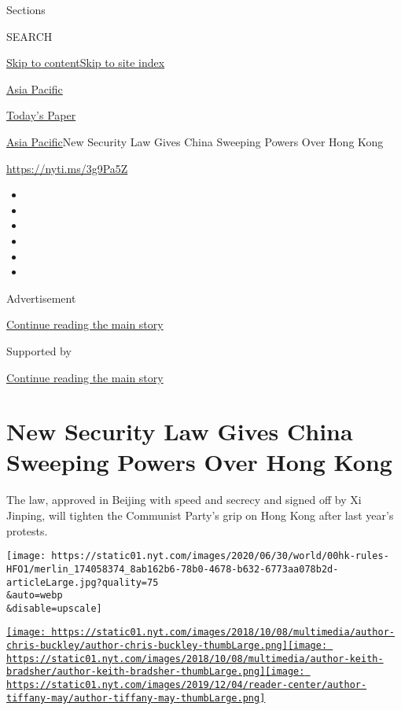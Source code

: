 Sections

SEARCH

\protect\hyperlink{site-content}{Skip to
content}\protect\hyperlink{site-index}{Skip to site index}

\href{https://www.nytimes.com/section/world/asia}{Asia Pacific}

\href{https://myaccount.nytimes.com/auth/login?response_type=cookie\&client_id=vi}{}

\href{https://www.nytimes.com/section/todayspaper}{Today's Paper}

\href{/section/world/asia}{Asia Pacific}\textbar{}New Security Law Gives
China Sweeping Powers Over Hong Kong

\url{https://nyti.ms/3g9Pa5Z}

\begin{itemize}
\item
\item
\item
\item
\item
\item
\end{itemize}

Advertisement

\protect\hyperlink{after-top}{Continue reading the main story}

Supported by

\protect\hyperlink{after-sponsor}{Continue reading the main story}

\hypertarget{new-security-law-gives-china-sweeping-powers-over-hong-kong}{%
\section{New Security Law Gives China Sweeping Powers Over Hong
Kong}\label{new-security-law-gives-china-sweeping-powers-over-hong-kong}}

The law, approved in Beijing with speed and secrecy and signed off by Xi
Jinping, will tighten the Communist Party's grip on Hong Kong after last
year's protests.

\texttt{[image: https://static01.nyt.com/images/2020/06/30/world/00hk-rules-HFO1/merlin\_174058374\_8ab162b6-78b0-4678-b632-6773aa078b2d-articleLarge.jpg?quality=75\\\&auto=webp\\\&disable=upscale]}

\href{https://www.nytimes.com/by/chris-buckley}{\texttt{[image: https://static01.nyt.com/images/2018/10/08/multimedia/author-chris-buckley/author-chris-buckley-thumbLarge.png]}}\href{https://www.nytimes.com/by/keith-bradsher}{\texttt{[image: https://static01.nyt.com/images/2018/10/08/multimedia/author-keith-bradsher/author-keith-bradsher-thumbLarge.png]}}\href{https://www.nytimes.com/by/tiffany-may}{\texttt{[image: https://static01.nyt.com/images/2019/12/04/reader-center/author-tiffany-may/author-tiffany-may-thumbLarge.png]}}

